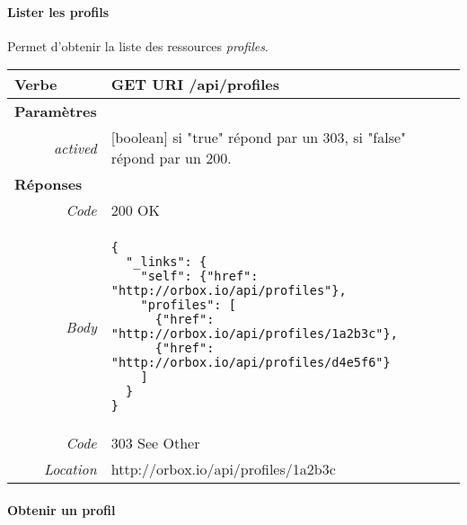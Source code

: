 \begin{appendices}
\begin{absolutelynopagebreak}
\paragraph{Lister les profils}

Permet d'obtenir la liste des ressources \emph{profiles}.

\begin{tabular}{@{}p{2cm}p{11.5cm}@{}}
    \toprule
    \textbf{Verbe}                        & GET \hspace{2.5cm} \textbf{URI} \hspace{0.25cm} /api/profiles   \\ \midrule
    \textbf{Paramètres}                   &        \\
    \multicolumn{1}{r}{\textit{actived}} & [boolean] si "true" répond par un 303, si "false" répond par un 200.  \\
    \midrule
    \textbf{Réponses}                     &        \\
    \multicolumn{1}{r}{\textit{Code}}   & 200 OK \\
    \multicolumn{1}{r}{\textit{Body}}   & \begin{verbatim}
{
  "_links": {
    "self": {"href": "http://orbox.io/api/profiles"},
    "profiles": [
      {"href": "http://orbox.io/api/profiles/1a2b3c"},
      {"href": "http://orbox.io/api/profiles/d4e5f6"}
    ]
  }
}
    \end{verbatim}
    \\ \midrule
    \multicolumn{1}{r}{\textit{Code}}   & 303 See Other \\
    \multicolumn{1}{r}{\textit{Location}}   & http://orbox.io/api/profiles/1a2b3c \\
    \bottomrule
\end{tabular}
\end{absolutelynopagebreak}
  
\begin{absolutelynopagebreak}
\paragraph{Obtenir un profil}


\end{absolutelynopagebreak}
\end{appendices}
